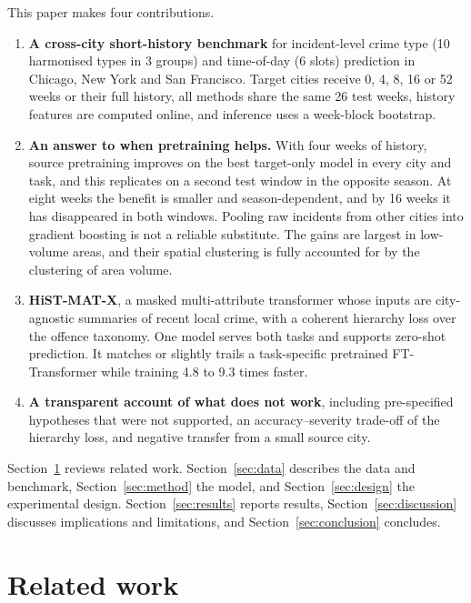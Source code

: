\documentclass[11pt]{article}
\newcommand{\HMX}{HiST-MAT-X}
\begin{document}
This paper makes four contributions.
\begin{enumerate}
\item \textbf{A cross-city short-history benchmark} for incident-level crime type (10 harmonised types in 3 groups) and time-of-day (6 slots) prediction in Chicago, New York and San Francisco. Target cities receive 0, 4, 8, 16 or 52 weeks or their full history, all methods share the same 26 test weeks, history features are computed online, and inference uses a week-block bootstrap.
\item \textbf{An answer to when pretraining helps.} With four weeks of history, source pretraining improves on the best target-only model in every city and task, and this replicates on a second test window in the opposite season. At eight weeks the benefit is smaller and season-dependent, and by 16 weeks it has disappeared in both windows. Pooling raw incidents from other cities into gradient boosting is not a reliable substitute. The gains are largest in low-volume areas, and their spatial clustering is fully accounted for by the clustering of area volume.
\item \textbf{\HMX{}}, a masked multi-attribute transformer whose inputs are city-agnostic summaries of recent local crime, with a coherent hierarchy loss over the offence taxonomy. One model serves both tasks and supports zero-shot prediction. It matches or slightly trails a task-specific pretrained FT-Transformer while training 4.8 to 9.3 times faster.
\item \textbf{A transparent account of what does not work}, including pre-specified hypotheses that were not supported, an accuracy--severity trade-off of the hierarchy loss, and negative transfer from a small source city.
\end{enumerate}

Section~\ref{sec:related} reviews related work. Section~\ref{sec:data} describes the data and benchmark, Section~\ref{sec:method} the model, and Section~\ref{sec:design} the experimental design. Section~\ref{sec:results} reports results, Section~\ref{sec:discussion} discusses implications and limitations, and Section~\ref{sec:conclusion} concludes.

\section{Related work}\label{sec:related}
\end{document}

